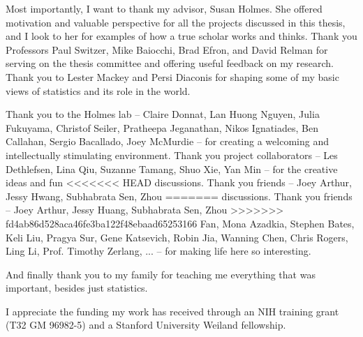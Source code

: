 
Most importantly, I want to thank my advisor, Susan Holmes. She offered
motivation and valuable perspective for all the projects discussed in this
thesis, and I look to her for examples of how a true scholar works and thinks.
Thank you Professors Paul Switzer, Mike Baiocchi, Brad Efron, and David Relman
for serving on the thesis committee and offering useful feedback on my research.
Thank you to Lester Mackey and Persi Diaconis for shaping some of my basic views
of statistics and its role in the world.

Thank you to the Holmes lab -- Claire Donnat, Lan Huong Nguyen, Julia Fukuyama,
Christof Seiler, Pratheepa Jeganathan, Nikos Ignatiades, Ben Callahan, Sergio
Bacallado, Joey McMurdie -- for creating a welcoming and intellectually
stimulating environment. Thank you project collaborators -- Les Dethlefsen, Lina
Qiu, Suzanne Tamang, Shuo Xie, Yan Min -- for the creative ideas and fun
<<<<<<< HEAD
discussions. Thank you friends -- Joey Arthur, Jessy Hwang, Subhabrata Sen, Zhou
=======
discussions. Thank you friends -- Joey Arthur, Jessy Huang, Subhabrata Sen, Zhou
>>>>>>> fd4ab86d528aca46fe3ba122f48ebaad65253166
Fan, Mona Azadkia, Stephen Bates, Keli Liu, Pragya Sur, Gene Katsevich, Robin
Jia, Wanning Chen, Chris Rogers, Ling Li, Prof. Timothy Zerlang, ... -- for
making life here so interesting.

And finally thank you to my family for teaching me everything that was
important, besides just statistics.

I appreciate the funding my work has received through an NIH training grant (T32
GM 96982-5) and a Stanford University Weiland fellowship.
